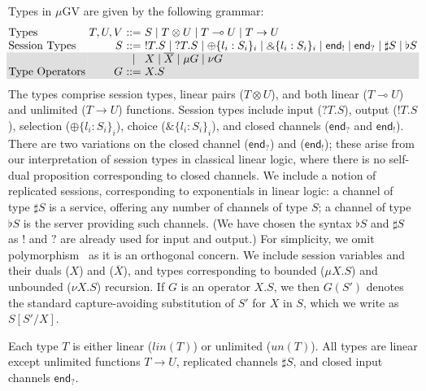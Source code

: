 \documentclass[orivec,envcountsame]{llncs}
\newcommand{\with}{\mathbin\binampersand}
\newcommand{\gvdual}[1]{\overline{#1}}
\newcommand{\gvout}[2]{{!#1.#2}}
\newcommand{\gvin}[2]{{?#1.#2}}
\newcommand{\lto}{\ensuremath{\multimap}}
\newcommand{\uto}{\ensuremath{\rightarrow}}
\newcommand{\outterm}{\mkwd{end}_!}
\newcommand{\interm}{\mkwd{end}_?}
\newcommand{\gvserver}[1]{\flat #1}
\newcommand{\gvservice}[1]{\sharp #1}
\newcommand{\mkwd}[1]{\mathsf{#1}}
\newcommand{\un}{un}
\newcommand{\lin}{lin}
\newcommand{\mugv}{$\mu\mathrm{GV}$\xspace}
\newcommand\shaderow{\noalign{\vskip-0.4pt}\rowcolor{shade}[0.6mm]}
\begin{document}
Types in \mugv are given by the following grammar:
\small
\[
\begin{array}{@{}l@{~}r@{~}c@{~}l@{}}
  \text{Types}         & T,U,V & ::= & S \mid T \otimes U \mid T \lto U \mid T \uto U \\
  \text{Session Types} & S     & ::= & \gvout{T}{S} \mid \gvin{T}{S}
                                \mid   \oplus \{ l_i : S_i \}_i \mid \with \{ l_i : S_i \}_i
                                \mid   \outterm \mid \interm
                                \mid   \gvservice{S} \mid \gvserver{S} \\ \shaderow
                            & & \mid & X \mid \gvdual{X}
                                \mid   {\mu G} \mid {\nu G} \\  \shaderow
  \text{Type Operators} & G    & ::= & X.S \\
\end{array}
\]\normalsize%
%
The types comprise session types, linear pairs ($T \otimes U$), and both linear ($T \lto U$) and
unlimited ($T \uto U$) functions.
%
Session types include input ($\gvin{T}{S}$), output ($\gvout{T}{S}$), selection ($\oplus\{ l_i:S_i
\}_i$), choice ($\with\{l_i:S_i\}_i$), and closed channels ($\interm$ and $\outterm$). There are two
variations on the closed channel ($\interm$) and ($\outterm$); these arise from our interpretation
of session types in classical linear logic, where there is no self-dual proposition corresponding to
closed channels.  We include a notion of replicated sessions, corresponding to exponentials in
linear logic: a channel of type $\gvservice{S}$ is a service, offering any number of channels of
type $S$; a channel of type $\gvserver{S}$ is the server providing such channels. (We have chosen
the syntax $\gvserver{S}$ and $\gvservice{S}$ as $!$ and $?$ are already used for input and output.)
%
For simplicity, we omit polymorphism~\citep{LindleyM14} as it is an orthogonal concern.
%
We include session variables and their duals ($X$) and ($\gvdual{X}$), and types corresponding to
bounded ($\mu X.S$) and unbounded ($\nu X.S$) recursion. If $G$ is an operator $X.S$, we then
$G(S')$ denotes the standard capture-avoiding substitution of $S'$ for $X$ in $S$, which we write as
$S[S'/X]$.

Each type $T$ is either linear ($\lin(T)$) or unlimited ($\un(T)$).
All types are linear except unlimited functions $T \uto U$, replicated channels $\gvservice{S}$, and
closed input channels $\interm$.
\end{document}
